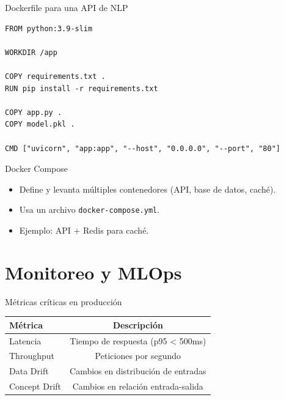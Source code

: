 \documentclass[aspectratio=169, 10pt, xcolor=table]{beamer}
\begin{document}
\begin{frame}[fragile]{Dockerfile para una API de NLP}
    \begin{lstlisting}
FROM python:3.9-slim

WORKDIR /app

COPY requirements.txt .
RUN pip install -r requirements.txt

COPY app.py .
COPY model.pkl .

CMD ["uvicorn", "app:app", "--host", "0.0.0.0", "--port", "80"]
    \end{lstlisting}
\end{frame}

\begin{frame}{Docker Compose}
    \begin{itemize}
        \item Define y levanta múltiples contenedores (API, base de datos, caché).
        \item Usa un archivo \texttt{docker-compose.yml}.
        \item Ejemplo: API + Redis para caché.
    \end{itemize}
\end{frame}

\section{Monitoreo y MLOps}

\begin{frame}{Métricas críticas en producción}
    \begin{table}
        \centering
        \begin{tabular}{l|c}
            \toprule
            \textbf{Métrica} & \textbf{Descripción} \\
            \midrule
            Latencia & Tiempo de respuesta (p95 < 500ms) \\
            Throughput & Peticiones por segundo \\
            Data Drift & Cambios en distribución de entradas \\
            Concept Drift & Cambios en relación entrada-salida \\
            \bottomrule
        \end{tabular}
    \end{table}
\end{frame}
\end{document}
